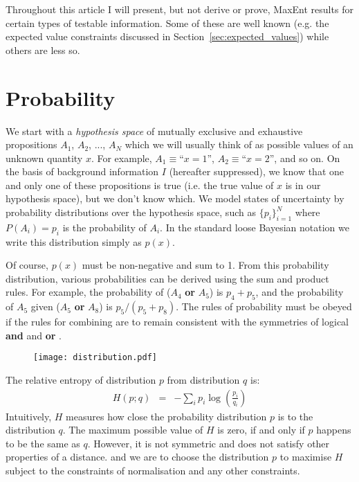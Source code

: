\documentclass[a4paper, 11pt]{article}
\begin{document}
Throughout this article I will present, but not derive or prove, MaxEnt
results for certain types of testable information. Some of these are well
known (e.g. the expected value constraints discussed in
Section~\ref{sec:expected_values}) while others are less so.

\section{Probability}
We start with a {\it hypothesis space} of mutually exclusive and
exhaustive propositions $A_1$, $A_2$, ..., $A_N$ which we will usually
think of as possible values of an unknown quantity $x$. For example,
$A_1 \equiv $``$x=1$'', $A_2 \equiv $``$x=2$'', and so on.
On the basis of background
information $I$ (hereafter suppressed), we know that one and only one of these
propositions is true (i.e. the true value of $x$ is in our hypothesis space),
but we don't know which. We model states of
uncertainty by probability distributions over the hypothesis space,
such as $\{p_i\}_{i=1}^N$ where $P(A_i) = p_i$ is the probability of $A_i$.
In the standard loose Bayesian notation we write this distribution simply
as $p(x)$.

Of course, $p(x)$ must be non-negative and sum to 1.
From this probability distribution, various probabilities can be derived
using the sum and product rules. For example, the probability of
($A_4$ {\bf or} $A_5$) is $p_4 + p_5$, and the probability of $A_5$ given
($A_5$ {\bf or} $A_8$) is $p_5/(p_5 + p_8)$. The rules of probability must
be obeyed if the rules for combining are to remain consistent
with the symmetries of logical {\bf and} and {\bf or}
\citep{2010arXiv1008.4831K}.

\begin{figure}
\begin{center}
\texttt{[image: distribution.pdf]}
\caption{\label{fig:distribution}}
\end{center}
\end{figure}

The relative entropy of distribution $p$ from distribution $q$ is:
\begin{eqnarray}
H(p; q) &=& -\sum_i p_i \log\left(\frac{p_i}{q_i}\right) 
\end{eqnarray}
Intuitively, $H$ measures how close the probability distribution $p$ is
to the distribution $q$. The maximum possible value of $H$ is zero, if
and only if $p$ happens to be the same as $q$.
However, it is not symmetric and does not satisfy
other properties of a distance.
and we are to choose the distribution $p$ to maximise $H$ subject to the
constraints of normalisation and any other constraints.
\end{document}
